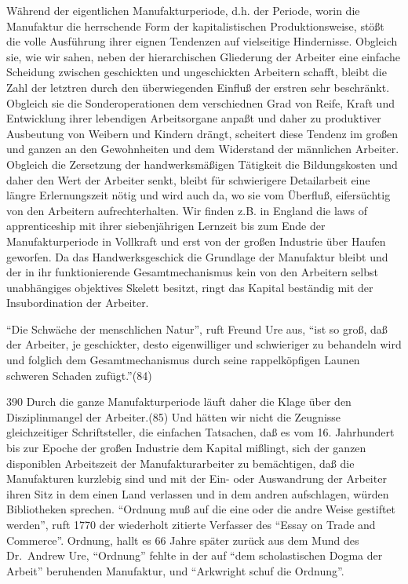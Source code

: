 {Während der eigentlichen Manufakturperiode, d.h. der Periode, worin die
Manufaktur die herrschende Form der kapitalistischen Produktionsweise,
stößt die volle Ausführung ihrer eignen Tendenzen auf vielseitige
Hindernisse. Obgleich sie, wie wir sahen, neben der hierarchischen
Gliederung der Arbeiter eine einfache Scheidung zwischen geschickten und
ungeschickten Arbeitern schafft, bleibt die Zahl der letztren durch den
überwiegenden Einfluß der erstren sehr beschränkt. Obgleich sie die
Sonderoperationen dem verschiednen Grad von Reife, Kraft und Entwicklung
ihrer lebendigen Arbeitsorgane anpaßt und daher zu produktiver
Ausbeutung von Weibern und Kindern drängt, scheitert diese Tendenz im
großen und ganzen an den Gewohnheiten und dem Widerstand der männlichen
Arbeiter. Obgleich die Zersetzung der handwerksmäßigen Tätigkeit die
Bildungskosten und daher den Wert der Arbeiter senkt, bleibt für
schwierigere Detailarbeit eine längre Erlernungszeit nötig und wird auch
da, wo sie vom Überfluß, eifersüchtig von den Arbeitern
aufrechterhalten. Wir finden z.B. in England die laws of apprenticeship
mit ihrer siebenjährigen Lernzeit bis zum Ende der Manufakturperiode in
Vollkraft und erst von der großen Industrie über Haufen geworfen. Da das
Handwerksgeschick die Grundlage der Manufaktur bleibt und der in ihr
funktionierende Gesamtmechanismus kein von den Arbeitern selbst
unabhängiges objektives Skelett besitzt, ringt das Kapital beständig mit
der Insubordination der Arbeiter.

``Die Schwäche der menschlichen Natur'', ruft Freund Ure aus, ``ist so
groß, daß der Arbeiter, je geschickter, desto eigenwilliger und
schwieriger zu behandeln wird und folglich dem Gesamtmechanismus durch
seine rappelköpfigen Launen schweren Schaden zufügt.''(84)

\num{390} Durch die ganze Manufakturperiode läuft
daher die Klage über den Disziplinmangel der Arbeiter.(85) Und hätten
wir nicht die Zeugnisse gleichzeitiger Schriftsteller, die einfachen
Tatsachen, daß es vom 16. Jahrhundert bis zur Epoche der großen
Industrie dem Kapital mißlingt, sich der ganzen disponiblen Arbeitszeit
der Manufakturarbeiter zu bemächtigen, daß die Manufakturen kurzlebig
sind und mit der Ein- oder Auswandrung der Arbeiter ihren Sitz in dem
einen Land verlassen und in dem andren aufschlagen, würden Bibliotheken
sprechen. ``Ordnung muß auf die eine oder die andre Weise gestiftet
werden'', ruft 1770 der wiederholt zitierte Verfasser des ``Essay on
Trade and Commerce''. Ordnung, hallt es 66 Jahre später zurück aus dem
Mund des Dr.~Andrew Ure, ``Ordnung'' fehlte in der auf ``dem
scholastischen Dogma der Arbeit'' beruhenden Manufaktur, und ``Arkwright
schuf die Ordnung''.

}
